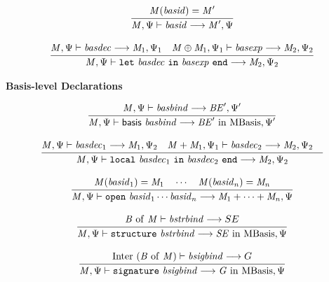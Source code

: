 \begin{equation}
{\frac{\displaystyle\strut{
\mathit{M}(\mathit{basid}) = \mathit{M}'
}}{\displaystyle\strut{
\mathit{M}, \Psi \vdash \mathit{basid} \longrightarrow \mathit{M}', \Psi
}}}
\end{equation}

\begin{equation}
{\frac{\displaystyle\strut{
\mathit{M}, \Psi \vdash \mathit{basdec} \longrightarrow \mathit{M}_1, \Psi_1 \quad
\mathit{M} \oplus \mathit{M}_1, \Psi_1 \vdash \mathit{basexp} \longrightarrow \mathit{M}_2, \Psi_2
}}{\displaystyle\strut{
\mathit{M}, \Psi \vdash \mathtt{let}~ \mathit{basdec} ~\mathtt{in}~ \mathit{basexp} ~\mathtt{end} \longrightarrow \mathit{M}_2, \Psi_2
}}}
\end{equation}

\vspace{2\parsep}
{\large\noindent
\textbf{Basis-level Declarations} \hfill 
{}
}\nopagebreak

\begin{equation}
{\frac{\displaystyle\strut{
\mathit{M}, \Psi  \vdash \mathit{basbind} \longrightarrow \mathit{BE}', \Psi'
}}{\displaystyle\strut{
\mathit{M}, \Psi  \vdash \mathsf{basis}~ \mathit{basbind} \longrightarrow \mathit{BE}' ~\mathrm{in}~ \mathrm{MBasis}, \Psi'
}}}
\end{equation}

\begin{equation}
{\frac{\displaystyle\strut{
\mathit{M}, \Psi  \vdash \mathit{basdec}_1 \longrightarrow \mathit{M}_1, \Psi_2 \quad
\mathit{M} + \mathit{M}_1, \Psi_1  \vdash \mathit{basdec}_2 \longrightarrow \mathit{M}_2, \Psi_2 \quad
}}{\displaystyle\strut{
\mathit{M}, \Psi  \vdash \mathtt{local}~ \mathit{basdec}_1 ~\mathtt{in}~ \mathit{basdec}_2 ~\mathtt{end} \longrightarrow \mathit{M}_2, \Psi_2
}}}
\end{equation}

\begin{equation}
{\frac{\displaystyle\strut{
\mathit{M}(\mathit{basid}_1) = \mathit{M}_1 \quad \cdots \quad
\mathit{M}(\mathit{basid}_n) = \mathit{M}_n 
}}{\displaystyle\strut{
\mathit{M}, \Psi  \vdash \mathtt{open}~ \mathit{basid}_1 \cdots \mathit{basid}_n \longrightarrow \mathit{M}_1 + \cdots + \mathit{M}_n, \Psi
}}}
\end{equation}

\begin{equation}
{\frac{\displaystyle\strut{
\mathit{B}~\mathrm{of}~\mathit{M} \vdash \mathit{bstrbind} \longrightarrow SE
}}{\displaystyle\strut{
\mathit{M}, \Psi  \vdash \mathtt{structure}~ \mathit{bstrbind}
\longrightarrow \mathit{SE} ~\mathrm{in}~ \mathrm{MBasis}, \Psi
}}}
\end{equation}

\begin{equation}
{\frac{\displaystyle\strut{
\mathrm{Inter}~(\mathit{B}~\mathrm{of}~\mathit{M}) \vdash \mathit{bsigbind} \longrightarrow G
}}{\displaystyle\strut{
\mathit{M}, \Psi  \vdash \mathtt{signature}~ \mathit{bsigbind}
\longrightarrow \mathit{G } ~\mathrm{in}~ \mathrm{MBasis}, \Psi
}}}
\end{equation}

